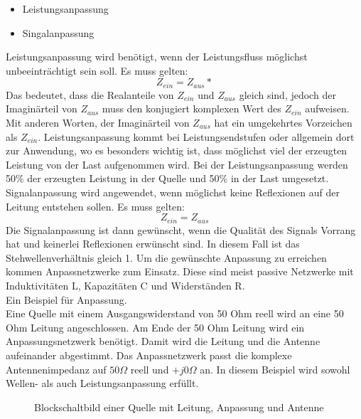 \begin{itemize}
\item 	Leistungsanpassung
\item 	Singalanpassung
\end{itemize}
Leistungsanpassung wird benötigt, wenn der Leistungsfluss möglichst unbeeinträchtigt sein soll. Es muss gelten:
\[Z_{ein}=Z_{aus}*\]
Das bedeutet, dass die Realanteile von $Z_{ein}$ und $Z_{aus}$ gleich sind, jedoch der Imaginärteil von $Z_{aus}$ muss den konjugiert komplexen Wert des $Z_{ein}$ aufweisen. Mit anderen Worten,  der Imaginärteil von $Z_{aus}$ hat ein umgekehrtes Vorzeichen als  $Z_{ein}$. Leistungsanpassung kommt bei Leistungsendstufen oder allgemein dort zur Anwendung, wo es besonders wichtig ist, dass möglichst viel der erzeugten Leistung von der Last aufgenommen wird. Bei der Leistungsanpassung werden  50\% der erzeugten Leistung in  der Quelle  und 50\% in der Last umgesetzt.
Signalanpassung wird angewendet, wenn möglichst keine Reflexionen auf der Leitung entstehen sollen. Es muss gelten:
\[Z_{ein}=Z_{aus}\]
Die Signalanpassung ist dann gewünscht, wenn die Qualität des Signals Vorrang hat und keinerlei Reflexionen erwünscht sind. In diesem Fall ist das Stehwellenverhältnis gleich 1.
Um die  gewünschte Anpassung zu erreichen kommen Anpassnetzwerke zum Einsatz. Diese sind meist passive Netzwerke mit Induktivitäten L, Kapazitäten C und Widerständen R.\\
Ein Beispiel für Anpassung.\\
Eine Quelle mit einem Ausgangswiderstand von  50 Ohm reell wird an eine 50 Ohm Leitung angeschlossen. Am Ende der 50 Ohm Leitung wird ein  Anpassungsnetzwerk benötigt. Damit wird die Leitung und die Antenne aufeinander abgestimmt. Das Anpassnetzwerk passt die komplexe Antennenimpedanz auf $50\Omega$ reell und $+j0\Omega$ an. In diesem Beispiel wird sowohl Wellen- als auch Leistungsanpassung erfüllt.\\


\begin{figure}[!ht]
	\begin{center}
	\end{center}
\caption{Blockschaltbild einer  Quelle mit Leitung, Anpassung und Antenne}
\label{Anpassung}
\end{figure}

